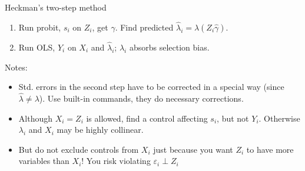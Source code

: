 \documentclass[pdftex]{beamer}
\begin{document}
\begin{frame}{Heckman's two-step method}
\begin{enumerate}
	\item{Run probit, $s_i$ on $Z_i$, get $\widehat\gamma$. Find predicted $\widehat\lambda_i = \lambda(Z_i\widehat{\gamma})$.}
	\item{Run OLS, $Y_i$ on $X_i$ and $\widehat\lambda_i$; $\widehat\lambda_i$ absorbs selection bias.}
\end{enumerate}
Notes:
\begin{itemize}
	\item{Std. errors in the second step have to be corrected in a special way (since $\widehat\lambda\neq\lambda$). Use built-in commands, they do necessary corrections.}
	\item{Although $X_i = Z_i$ is allowed, find a control affecting $s_i$, but not $Y_i$. Otherwise $\lambda_i$ and $X_i$ may be highly collinear.}
	\item{But do not exclude controls from $X_i$ just because you want $Z_i$ to have more variables than $X_i$! You risk violating $\varepsilon_i\perp{Z_i}$}
\end{itemize}
\end{frame}
\end{document}
